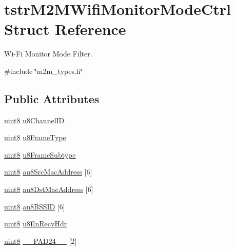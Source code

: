 \hypertarget{structtstrM2MWifiMonitorModeCtrl}{}\section{tstr\+M2\+M\+Wifi\+Monitor\+Mode\+Ctrl Struct Reference}
\label{structtstrM2MWifiMonitorModeCtrl}


Wi-\/\+Fi Monitor Mode Filter.  




{\ttfamily \#include \char`\"{}m2m\+\_\+types.\+h\char`\"{}}

\subsection*{Public Attributes}
\begin{DoxyCompactItemize}
\item 
\hyperlink{group__DataT_ga4df709a77647e870bbf1d955b8edc9a6}{uint8} \hyperlink{structtstrM2MWifiMonitorModeCtrl_aa171fa84ecfab4b966e935825f1f23f6}{u8\+Channel\+ID}
\item 
\hyperlink{group__DataT_ga4df709a77647e870bbf1d955b8edc9a6}{uint8} \hyperlink{structtstrM2MWifiMonitorModeCtrl_a1302bd34bc71c93586443e1bfa0e5b20}{u8\+Frame\+Type}
\item 
\hyperlink{group__DataT_ga4df709a77647e870bbf1d955b8edc9a6}{uint8} \hyperlink{structtstrM2MWifiMonitorModeCtrl_a98f14e2b9c2aa0288517362886b9608a}{u8\+Frame\+Subtype}
\item 
\hyperlink{group__DataT_ga4df709a77647e870bbf1d955b8edc9a6}{uint8} \hyperlink{structtstrM2MWifiMonitorModeCtrl_a847ad12cf394e15bb7f4aecea0eb8222}{au8\+Src\+Mac\+Address} \mbox{[}6\mbox{]}
\item 
\hyperlink{group__DataT_ga4df709a77647e870bbf1d955b8edc9a6}{uint8} \hyperlink{structtstrM2MWifiMonitorModeCtrl_a17dc78f74326e73f049a9e0f46f8a0bc}{au8\+Dst\+Mac\+Address} \mbox{[}6\mbox{]}
\item 
\hyperlink{group__DataT_ga4df709a77647e870bbf1d955b8edc9a6}{uint8} \hyperlink{structtstrM2MWifiMonitorModeCtrl_a306c03fea20a6628d37ce2e9e03370c6}{au8\+B\+S\+S\+ID} \mbox{[}6\mbox{]}
\item 
\hyperlink{group__DataT_ga4df709a77647e870bbf1d955b8edc9a6}{uint8} \hyperlink{structtstrM2MWifiMonitorModeCtrl_ac0473c349a04e21cef677b366ddec83f}{u8\+En\+Recv\+Hdr}
\item 
\hyperlink{group__DataT_ga4df709a77647e870bbf1d955b8edc9a6}{uint8} \hyperlink{structtstrM2MWifiMonitorModeCtrl_ae87e7784d1fd54728cb47df66193a59f}{\+\_\+\+\_\+\+P\+A\+D24\+\_\+\+\_\+} \mbox{[}2\mbox{]}
\end{DoxyCompactItemize}


